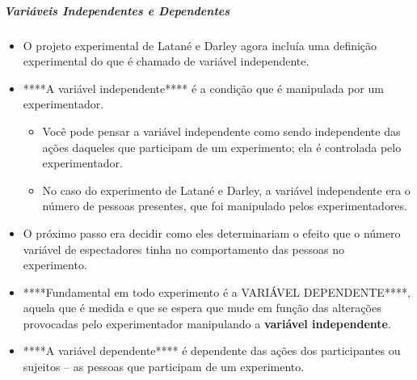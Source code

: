 \documentclass[
]{book}
\providecommand{\tightlist}{%
  \setlength{\itemsep}{0pt}\setlength{\parskip}{0pt}}
\begin{document}
\hypertarget{variuxe1veis-independentes-e-dependentes}{%
\subparagraph{Variáveis Independentes e Dependentes}\label{variuxe1veis-independentes-e-dependentes}}

\begin{itemize}
\tightlist
\item
  O projeto experimental de Latané e Darley agora incluía uma definição experimental do que é chamado de variável independente.
\item
  ****A variável independente**** é a condição que é manipulada por um experimentador.

  \begin{itemize}
  \tightlist
  \item
    Você pode pensar a variável independente como sendo independente das ações daqueles que participam de um experimento; ela é controlada pelo experimentador.
  \item
    No caso do experimento de Latané e Darley, a variável independente era o número de pessoas presentes, que foi manipulado pelos experimentadores.
  \end{itemize}
\item
  O próximo passo era decidir como eles determinariam o efeito que o número variável de espectadores tinha no comportamento das pessoas no experimento.
\item
  ****Fundamental em todo experimento é a VARIÁVEL DEPENDENTE****, aquela que é medida e que se espera que mude em função das alterações provocadas pelo experimentador manipulando a \textbf{variável independente}.
\item
  ****A variável dependente**** é dependente das ações dos participantes ou sujeitos -- as pessoas que participam de um experimento.


\end{itemize}
\end{document}
